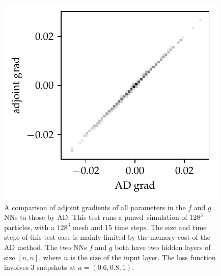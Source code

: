 \documentclass[modern, trackchanges, dvipsnames]{aastex631}
\newcommand{\pmwd}{{\usefont{T1}{nova}{m}{sl}pmwd}}
\begin{document}
\begin{figure}
  \centering
  \includegraphics[width=0.5\linewidth]{nn_grads_cmp.pdf}
  \caption{A comparison of adjoint gradients of all parameters in the $f$ and
  $g$ NNs to those by AD.
  This test runs a \pmwd\ simulation of $128^3$ particles, with a $128^3$ mesh
  and 15 time steps.
  The size and time steps of this test case is mainly limited by the memory cost
  of the AD method.
  The two NNs $f$ and $g$ both have two hidden layers of size $[n, n]$, where
  $n$ is the size of the input layer.
  The loss function involves 3 snapshots at $a=(0.6, 0.8, 1)$.
  }
  \label{fig:nn_grads_cmp}
\end{figure}


\end{document}
